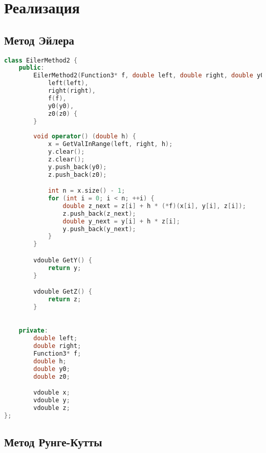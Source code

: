 \section*{Реализация}

\subsection*{Метод Эйлера}

\begin{lstlisting}[language=C++]
    class EilerMethod2 {
    public:
        EilerMethod2(Function3* f, double left, double right, double y0, double z0) :
            left(left),
            right(right),
            f(f),
            y0(y0),
            z0(z0) {
        }
    
        void operator() (double h) {
            x = GetValInRange(left, right, h);
            y.clear();
            z.clear();
            y.push_back(y0);
            z.push_back(z0);

            int n = x.size() - 1;
            for (int i = 0; i < n; ++i) {
                double z_next = z[i] + h * (*f)(x[i], y[i], z[i]);
                z.push_back(z_next);
                double y_next = y[i] + h * z[i];
                y.push_back(y_next);
            }
        }

        vdouble GetY() {
            return y;
        }

        vdouble GetZ() {
            return z;
        }
    

    private:
        double left;
        double right;
        Function3* f;
        double h;
        double y0;
        double z0;

        vdouble x;
        vdouble y;
        vdouble z;
};
\end{lstlisting}

\subsection*{Метод Рунге-Кутты}


